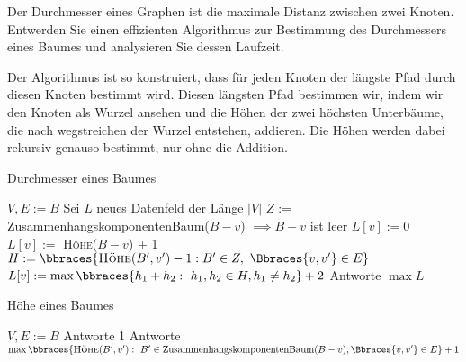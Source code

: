 
\begin{exercise}

Der Durchmesser eines Graphen ist die maximale Distanz zwischen zwei Knoten.
Entwerden Sie einen effizienten Algorithmus zur Bestimmung des Durchmessers
eines Baumes und analysieren Sie dessen Laufzeit.

\end{exercise}


\begin{solution}

Der Algorithmus ist so konstruiert, dass für jeden Knoten der längste Pfad durch diesen Knoten bestimmt wird. Diesen längsten Pfad bestimmen wir, indem wir den Knoten als Wurzel ansehen und die Höhen der zwei höchsten Unterbäume, die nach wegstreichen der Wurzel entstehen, addieren. Die Höhen werden dabei rekursiv genauso bestimmt, nur ohne die Addition. \pagebreak

\begin{algorithm}
  \caption{Durchmesser eines Baumes}
  \begin{algorithmic}[1]
    \State $V, E := B$
    \State Sei $L$ neues Datenfeld der Länge $|V|$
    \State $Z :=$ ZusammenhangskomponentenBaum($B-v$)
     $\implies B-v$ ist leer
    \State $L[v] := 0$
    \EndIf
    \State $L[v] :=$ \textsc{Höhe}($B-v$) + 1
    \EndIf
    \State $H := \bbraces{\textsc{Höhe}(B^\prime, v^\prime) - 1: B^\prime \in Z,~ \Bbraces{v,v^\prime} \in E}$
    \State $L[v] := \max \bbraces{h_1 + h_2:~ h_1,h_2 \in H, h_1 \neq h_2} + 2$
    \EndIf
    \EndFor
    \State Antworte $\max L$
    \EndProcedure
  \end{algorithmic}
\end{algorithm}

\begin{algorithm}
  \caption{Höhe eines Baumes}
  \begin{algorithmic}[1]
    \State $V, E := B$
    \State Antworte 1
    \EndIf
    \State Antworte $\max \bbraces{\textsc{Höhe}(B^\prime, v^\prime):~ B^\prime \in \text{ZusammenhangskomponentenBaum}(B-v), \Bbraces{v, v^\prime} \in E} + 1$
    \EndIf
    \EndProcedure
  \end{algorithmic}
\end{algorithm}



\end{solution}
